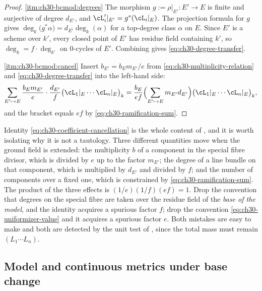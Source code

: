 \begin{proof}
\cref{itm:ch30-bcmod:degrees}  The morphism $g:=\rho|_{E'}:E'\to E$ is
finite and surjective of degree $d_{E'}$, and
$\cL'_i|_{E'}=g^*(\cL_i|_E)$.  The projection formula for $g$ gives
$\deg_k\bigl(g^*\alpha\bigr)=d_{E'}\deg_k(\alpha)$ for a top-degree class
$\alpha$ on $E$.  Since $E'$ is a scheme over $k'$, every closed
point of $E'$ has residue field containing $k'$, so
$\deg_k=f\cdot\deg_{k'}$ on $0$-cycles of $E'$.  Combining gives
\eqref{eq:ch30-degree-transfer}.

\cref{itm:ch30-bcmod:cancel}  Insert
$b_{E'}=b_Em_{E'}/e$ from \eqref{eq:ch30-multiplicity-relation} and
\eqref{eq:ch30-degree-transfer} into the left-hand side:
\[
 \sum_{E'\mapsto E}\frac{b_Em_{E'}}{e}\cdot\frac{d_{E'}}f
   \bigl(\cL_1|_E\cdots\cL_n|_E\bigr)_k
 =\frac{b_E}{ef}\Bigl(\sum_{E'\mapsto E}m_{E'}d_{E'}\Bigr)
   \bigl(\cL_1|_E\cdots\cL_n|_E\bigr)_k,
\]
and the bracket equals $ef$ by \eqref{eq:ch30-ramification-sum}.
\end{proof}

\begin{remark}
\label{rem:ch30-cancellation}
Identity \eqref{eq:ch30-coefficient-cancellation} is the whole content of
, and it is worth isolating why it is not a
tautology.  Three different quantities move when the ground field is
extended: the multiplicity $b$ of a component in the special fibre
divisor, which is divided by $e$ up to the factor $m_{E'}$; the degree
of a line bundle on that component, which is multiplied by $d_{E'}$ and
divided by $f$; and the number of components over a fixed one, which is
constrained by \eqref{eq:ch30-ramification-sum}.  The product of the three
effects is $(1/e)(1/f)(ef)=1$.  Drop the convention that degrees on the
special fibre are taken over the residue field of the \emph{base of the
model}, and the identity acquires a spurious factor $f$; drop the
convention \eqref{eq:ch30-uniformizer-value} and it acquires a spurious
factor $e$.  Both mistakes are easy to make and both are detected by the
unit test of , since the total mass must remain
$(L_1\cdots L_n)$.
\end{remark}

\subsection{Model and continuous metrics under base change}
\label{sec:ch30-bc-metrics}

